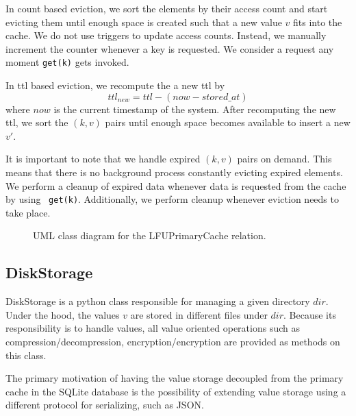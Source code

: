 In count based eviction,
we sort the elements by their access count and
start evicting them until enough space is created
such that a new value $v$ fits into the cache.
We do not use triggers to update access counts. Instead,
we manually increment the counter whenever a key is requested.
We consider a request any moment \texttt{get(k)} gets invoked.

In ttl based eviction,
we recompute the a new ttl by
\[
ttl_{new} = ttl - (now - stored\_at)
\]
where $now$ is the current timestamp of the system.
After recomputing the new ttl, we sort the $(k, v)$
pairs until enough space becomes available to insert a new $v'$.

It is important to note that we handle expired $(k, v)$ pairs
on demand. This means that there is no background process
constantly evicting expired elements. We perform
a cleanup of expired data whenever data is requested
from the cache by using ~\texttt{get(k)}. Additionally,
we perform cleanup whenever eviction needs to take place.

\begin{figure}[!htp]
    \centering
    \caption{UML class diagram for the LFUPrimaryCache relation.}
    \label{fig:lfu_cachetable_relation}
\end{figure}

\subsection{DiskStorage}
DiskStorage is a python class responsible for managing a given directory $dir$.
Under the hood, the values $v$ are stored in different files
under $dir$. Because its responsibility is to handle values,
all value oriented operations such as compression/decompression,
encryption/encryption are provided as methods on this class.

The primary motivation of having the value storage decoupled
from the primary cache in the SQLite database is the possibility
of extending value storage using a different protocol for serializing,
such as JSON.

